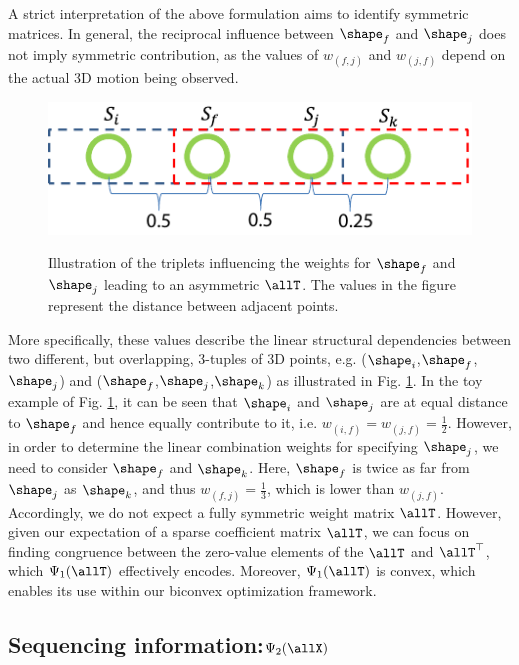 A strict interpretation of the above formulation aims to identify symmetric matrices.
In general, the reciprocal influence between $\shape_{f}$ and $\shape_{j}$ does not imply symmetric contribution,
as the values of $w_{(f,j)}$ and  $w_{(j,f)}$ depend on the actual 3D motion being observed.
\begin{figure}
  \centering
  \includegraphics[width=0.75\columnwidth]{chapter5/resource/TripletFig.pdf}\\
  \caption{Illustration of the triplets influencing the weights for $\shape_f$ and $\shape_j$ leading to an asymmetric $\allT$. The values in the figure represent the distance between adjacent points.}
  \label{fig:Triplet}
\end{figure}
More specifically, these values describe the linear structural  dependencies between two different, but overlapping, 3-tuples of 3D points, e.g. ($\shape_{i}$,$\shape_{f}$,$\shape_{j}$) and ($\shape_{f}$,$\shape_{j}$,$\shape_{k}$) as illustrated in Fig. \ref{fig:Triplet}. In the toy example of Fig. \ref{fig:Triplet}, it can be seen that $\shape_{i}$ and $\shape_{j}$ are at equal distance to $\shape_{f}$ and hence equally contribute to it, i.e. $w_{(i,f)} = w_{(j,f)}=\frac{1}{2}$. However, in order to determine the linear combination weights for specifying $\shape_j$, we need to consider $\shape_f$ and $\shape_k$. Here, $\shape_f$ is twice as far from $\shape_j$ as $\shape_k$, and thus $w_{(f,j)}=\frac{1}{3}$, which is lower than $w_{(j,f)}$.
Accordingly, we do not expect a fully symmetric weight matrix   $\allT$. However,  given our expectation of a sparse coefficient matrix $\allT$, we can focus on finding congruence between the zero-value elements of the $\allT$ and $\allT^\top$, which $\Psi_1(\allT)$ effectively encodes.
Moreover, $\Psi_1(\allT)$  is convex, which enables its use within our biconvex optimization framework.

\subsection{Sequencing information:$\Psi_2(\allX)$}

